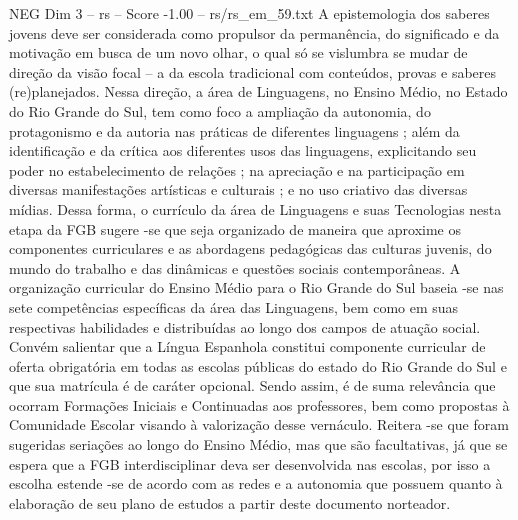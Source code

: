 \begin{textsample}{NEG Dim 3 – rs – Score -1.00 – rs/rs\_em\_59.txt}
A epistemologia dos saberes jovens deve ser considerada como propulsor da permanência, do significado e da motivação em busca de um novo olhar, o qual só se vislumbra se mudar de direção da visão focal – a da escola tradicional com conteúdos, provas e saberes (re)planejados.
Nessa direção, a área de Linguagens, no Ensino Médio, no Estado do Rio Grande do Sul, tem como foco a ampliação da autonomia, do protagonismo e da autoria nas práticas de diferentes linguagens ; além da identificação e da crítica aos diferentes usos das linguagens, explicitando seu poder no estabelecimento de relações ; na apreciação e na participação em diversas manifestações artísticas e culturais ; e no uso criativo das diversas mídias.
Dessa forma, o currículo da área de Linguagens e suas Tecnologias nesta etapa da FGB sugere -se que seja organizado de maneira que aproxime os componentes curriculares e as abordagens pedagógicas das culturas juvenis, do mundo do trabalho e das dinâmicas e questões sociais contemporâneas.
A organização curricular do Ensino Médio para o Rio Grande do Sul baseia -se nas sete competências específicas da área das Linguagens, bem como em suas respectivas habilidades e distribuídas ao longo dos campos de atuação social.
Convém salientar que a Língua Espanhola constitui componente curricular de oferta obrigatória em todas as escolas públicas do estado do Rio Grande do Sul e que sua matrícula é de caráter opcional.
Sendo assim, é de suma relevância que ocorram Formações Iniciais e Continuadas aos professores, bem como propostas à Comunidade Escolar visando à valorização desse vernáculo.
Reitera -se que foram sugeridas seriações ao longo do Ensino Médio, mas que são facultativas, já que se espera que a FGB interdisciplinar deva ser desenvolvida nas escolas, por isso a escolha estende -se de acordo com as redes e a autonomia que possuem quanto à elaboração de seu plano de estudos a partir deste documento norteador.

\end{textsample}
